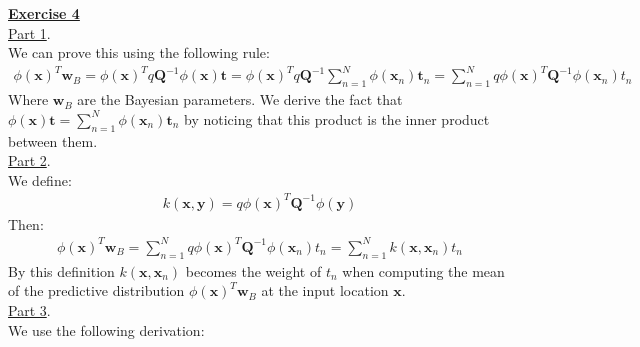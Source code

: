 \documentclass[a4paper, 11pt]{article}
\begin{document}
\newpage
\textbf{\underline{Exercise 4}}\\
\newline \underline{Part 1}. \\
\newline We can prove this using the following rule:
\begin{eqnarray}
\phi (\mathbf{x})^T \mathbf{w}_B = \phi (\mathbf{x})^T q \mathbf{Q}^{-1} \phi (\mathbf{x}) \mathbf{t} = \phi (\mathbf{x})^T q \mathbf{Q}^{-1} \sum_{n = 1}^{N} \phi (\mathbf{x}_n) \mathbf{t}_n = \sum_{n=1}^{N} q \phi (\mathbf{x})^T \mathbf{Q}^{-1} \phi(\mathbf{x}_n) t_n  \nonumber
\end{eqnarray}
\newline Where $\mathbf{w}_B$ are the Bayesian parameters. We derive the fact that $\phi (\mathbf{x}) \mathbf{t} = \sum_{n = 1}^{N} \phi (\mathbf{x}_n) \mathbf{t}_n$ by noticing that this product is the inner product between them.\\
\newline \underline{Part 2}. \\
\newline We define:
\begin{eqnarray}
k(\mathbf{x}, \mathbf{y}) = q \phi (\mathbf{x})^T \mathbf{Q}^{-1} \phi (\mathbf{y}) \nonumber
\end{eqnarray}
Then:
\begin{eqnarray}
\phi (\mathbf{x})^T \mathbf{w}_B = \sum_{n=1}^{N} q \phi (\mathbf{x})^T \mathbf{Q}^{-1} \phi(\mathbf{x}_n) t_n = \sum_{n=1}^{N} k(\mathbf{x}, \mathbf{x}_n) t_n \nonumber
\end{eqnarray}
By this definition $k(\mathbf{x}, \mathbf{x}_n)$ becomes the weight of $t_n$ when computing the mean of the predictive distribution $\phi (\mathbf{x})^T \mathbf{w}_B$ at the input location $\mathbf{x}$.\\
\newline \underline{Part 3}. \\
\newline We use the following derivation:
\end{document}
